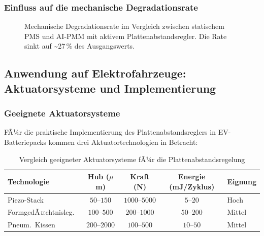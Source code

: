 ﻿\documentclass[12pt,a4paper]{article}
\begin{document}
\subsubsection{Einfluss auf die mechanische Degradationsrate}

\begin{figure}[H]
	\centering
	\caption{Mechanische Degradationsrate im Vergleich zwischen statischem
		PMS und AI-PMM mit aktivem Plattenabstandsregler. Die Rate sinkt
		auf \textasciitilde{}27\,\% des Ausgangswerts.}
	\label{fig:mech_deg_rate}
\end{figure}

\subsection{Anwendung auf Elektrofahrzeuge: Aktuatorsysteme und Implementierung}

\subsubsection{Geeignete Aktuatorsysteme}

FÃ¼r die praktische Implementierung des Plattenabstandsreglers in EV-Batteriepacks
kommen drei Aktuatortechnologien in Betracht:

\begin{table}[H]
	\centering
	\caption{Vergleich geeigneter Aktuatorsysteme fÃ¼r die Plattenabstandsregelung}
	\label{tab:actuators}
	\begin{tabular}{lcccl}
		\toprule
		\textbf{Technologie} & \textbf{Hub} ($\mu$m) & \textbf{Kraft} (N) & \textbf{Energie} (mJ/Zyklus) & \textbf{Eignung} \\
		\midrule
		Piezo-Stack & $50\text{--}150$ & $1000\text{--}5000$ & $5\text{--}20$ & Hoch \\
		FormgedÃ¤chtnisleg.\ & $100\text{--}500$ & $200\text{--}1000$ & $50\text{--}200$ & Mittel \\
		Pneum.\ Kissen & $200\text{--}2000$ & $100\text{--}500$ & $10\text{--}50$ & Mittel \\
		\bottomrule
	\end{tabular}
\end{table}
\end{document}
